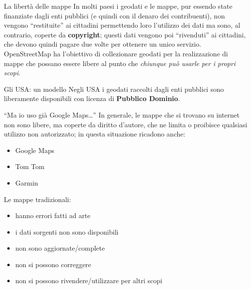 \documentclass[slidestop,compress,red,notes,xcolor=dvipsnames]{beamer}	%
\begin{document}
    \begin{frame}{La libertà delle mappe}
         In molti paesi i geodati e le mappe, pur essendo state finanziate dagli enti pubblici (e quindi con il denaro dei contribuenti), non vengono ``restituite'' ai cittadini permettendo loro l'utilizzo dei dati ma sono, al contrario, coperte da \textbf{copyright}; questi dati vengono poi ``rivenduti'' ai cittadini, che devono quindi pagare due volte per ottenere un unico servizio. OpenStreetMap ha l'obiettivo di collezionare geodati per la realizzazione di mappe che possano essere libere al punto che \textit{chiunque può usarle per i propri scopi}.\pause
         \begin{block}{Gli USA: un modello}
             Negli USA i geodati raccolti dagli enti pubblici sono liberamente disponibili con licenza di \textbf{Pubblico Dominio}.
         \end{block}
    \end{frame}

    \begin{frame}{``Ma io uso già Google Maps\ldots''}
        In generale, le mappe che si trovano su internet non sono libere, ma coperte da diritto d'autore, che ne limita o proibisce qualsiasi utilizzo non autorizzato; in questa situazione ricadono anche:
        \pause
        \begin{itemize}
            \item Google Maps
            \item Tom Tom
            \item Garmin
        \end{itemize}
        \pause
        Le mappe tradizionali:
        \begin{itemize}
            \item hanno errori fatti ad arte
            \item i dati sorgenti non sono disponibili
            \item non sono aggiornate/complete
            \item non si possono correggere
            \item non si possono rivendere/utilizzare per altri scopi
        \end{itemize}
    \end{frame}
\end{document}
